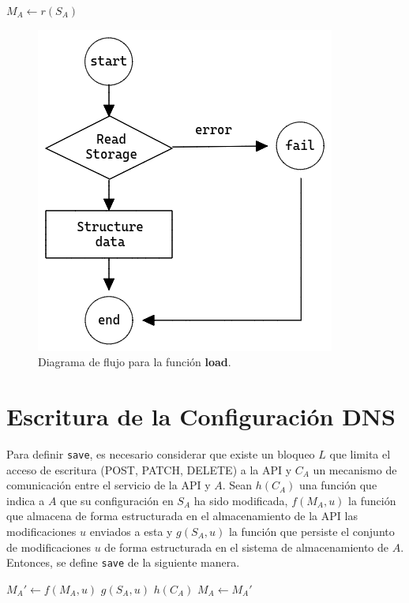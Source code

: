 \begin{algorithmic}
    \State $M_A \leftarrow r(S_A)$
\EndProcedure
\end{algorithmic}

\begin{figure}[!ht]
    \centering
    \includegraphics[width=0.5\linewidth]{draws/load.png}
    \caption{Diagrama de flujo para la función \textbf{load}.}
\end{figure}

\section{Escritura de la Configuración DNS}

Para definir \verb+save+, es necesario considerar que existe un bloqueo $L$ que limita el acceso de escritura (POST, PATCH, DELETE) a la API y $C_A$ un mecanismo de comunicación entre el servicio de la API y $A$. Sean $h(C_A)$ una función que indica a $A$ que su configuración en $S_A$ ha sido modificada, $f(M_A, u)$ la función que almacena de forma estructurada en el almacenamiento de la API las modificaciones $u$ enviados a esta y $g(S_A, u)$ la función que persiste el conjunto de modificaciones $u$ de forma estructurada en el sistema de almacenamiento de $A$. Entonces, se define \verb+save+ de la siguiente manera.

\begin{algorithmic}
    \State $M_A' \leftarrow f(M_A, u)$
    \State $g(S_A, u)$
    \State $h(C_A)$
    \State $M_A \leftarrow M_A'$
\EndProcedure
\end{algorithmic}

